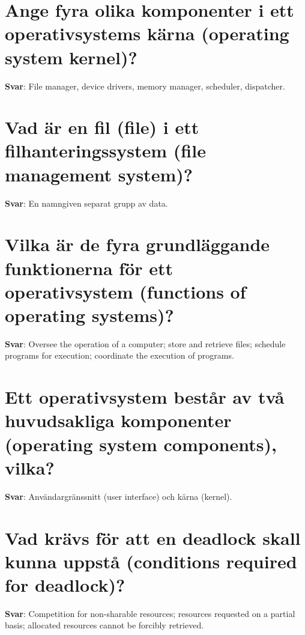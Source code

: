 \documentclass[a4paper,11pt,oneside]{book}
\begin{document}
\begin{sloppypar}
\section{Ange fyra olika komponenter i ett operativsystems k\"arna (operating system kernel)?}

\label{q:114:sa:sv:True}

\textbf{Svar}: File manager, device drivers, memory manager, scheduler, dispatcher.



\section{Vad \"ar en fil (file) i ett filhanteringssystem (file management system)?}

\label{q:115:sa:sv:True}

\textbf{Svar}: En namngiven separat grupp av data.



\section{Vilka \"ar de fyra grundl\"aggande funktionerna f\"or ett operativsystem (functions of operating systems)?}

\label{q:116:sa:sv:True}

\textbf{Svar}: Oversee the operation of a computer; store and retrieve files; schedule programs for execution; coordinate the execution of programs.



\section{Ett operativsystem best\r{a}r av tv\r{a} huvudsakliga komponenter (operating system components), vilka?}

\label{q:118:sa:sv:True}

\textbf{Svar}: Anv\"andargr\"anssnitt (user interface) och k\"arna (kernel).



\section{Vad kr\"avs f\"or att en deadlock skall kunna uppst\r{a} (conditions required for deadlock)?}

\label{q:119:sa:sv:True}

\textbf{Svar}: Competition for non-sharable resources; resources requested on a partial basis; allocated resources cannot be forcibly retrieved.




\end{sloppypar}
\end{document}
